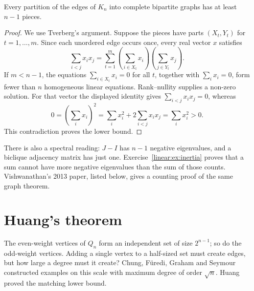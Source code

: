 \begin{theorem}\label{linear:thm:grahampollak}
Every partition of the edges of $K_n$ into complete bipartite graphs has at least $n-1$ pieces.
\end{theorem}
\begin{proof}
We use Tverberg's argument. Suppose the pieces have parts $(X_t,Y_t)$ for $t=1,\ldots,m$. Since each unordered edge occurs once, every real vector $x$ satisfies
\[
\sum_{i<j}x_ix_j=\sum_{t=1}^m
\left(\sum_{i\in X_t}x_i\right)\left(\sum_{j\in Y_t}x_j\right).
\]
If $m<n-1$, the equations $\sum_{i\in X_t}x_i=0$ for all $t$, together with $\sum_ix_i=0$, form fewer than $n$ homogeneous linear equations. Rank--nullity supplies a non-zero solution. For that vector the displayed identity gives $\sum_{i<j}x_ix_j=0$, whereas
\[
0=\left(\sum_ix_i\right)^2=\sum_ix_i^2+2\sum_{i<j}x_ix_j=\sum_ix_i^2>0.
\]
This contradiction proves the lower bound.
\end{proof}

There is also a spectral reading: $J-I$ has $n-1$ negative eigenvalues, and a biclique adjacency matrix has just one. Exercise~\ref{linear:ex:inertia} proves that a sum cannot have more negative eigenvalues than the sum of those counts. Vishwanathan's 2013 paper, listed below, gives a counting proof of the same graph theorem.

\section{Huang's theorem}

The even-weight vertices of $Q_n$ form an independent set of size $2^{n-1}$; so do the odd-weight vertices. Adding a single vertex to a half-sized set must create edges, but how large a degree must it create? Chung, F\"uredi, Graham and Seymour constructed examples on this scale with maximum degree of order $\sqrt n$. Huang proved the matching lower bound.

